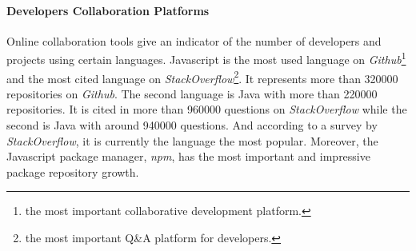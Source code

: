 \paragraph{Developers Collaboration Platforms}

Online collaboration tools give an indicator of the number of developers and projects using certain languages.
Javascript is the most used language on \textit{Github}\footnote{the most important collaborative development platform.} and the most cited language on \textit{StackOverflow}\footnote{the most important Q\&A platform for developers.}.
It represents more than \num{320000} repositories on \textit{Github}.
The second language is Java with more than \num{220000} repositories.
It is cited in more than \num{960000} questions on \textit{StackOverflow} while the second is Java with around \num{940000} questions.
And according to a survey by \textit{StackOverflow}, it is currently the language the most popular.
Moreover, the Javascript package manager, \textit{npm}, has the most important and impressive package repository growth.

\begin{figure}[h!]
\end{figure}

\begin{figure}[h!]
\end{figure}

